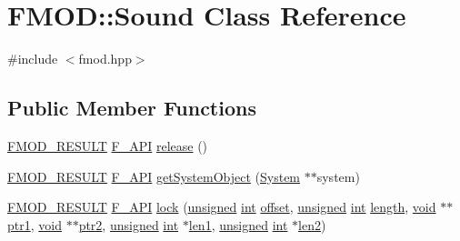 \hypertarget{class_f_m_o_d_1_1_sound}{\section{F\-M\-O\-D\-:\-:Sound Class Reference}
\label{class_f_m_o_d_1_1_sound}
}


{\ttfamily \#include $<$fmod.\-hpp$>$}

\subsection*{Public Member Functions}
\begin{DoxyCompactItemize}
\item 
\hyperlink{fmod_8h_ae6ddadf8cb315e93ae7e6456b19db276}{F\-M\-O\-D\-\_\-\-R\-E\-S\-U\-L\-T} \hyperlink{fmod_8h_ace803d13e798b0cdde4384f9f323b901}{F\-\_\-\-A\-P\-I} \hyperlink{class_f_m_o_d_1_1_sound_ab0d8425b6f8ad26b4011dc36fee9948c}{release} ()
\item 
\hyperlink{fmod_8h_ae6ddadf8cb315e93ae7e6456b19db276}{F\-M\-O\-D\-\_\-\-R\-E\-S\-U\-L\-T} \hyperlink{fmod_8h_ace803d13e798b0cdde4384f9f323b901}{F\-\_\-\-A\-P\-I} \hyperlink{class_f_m_o_d_1_1_sound_aed24d7342fc12299472454730828987e}{get\-System\-Object} (\hyperlink{class_f_m_o_d_1_1_system}{System} $\ast$$\ast$system)
\item 
\hyperlink{fmod_8h_ae6ddadf8cb315e93ae7e6456b19db276}{F\-M\-O\-D\-\_\-\-R\-E\-S\-U\-L\-T} \hyperlink{fmod_8h_ace803d13e798b0cdde4384f9f323b901}{F\-\_\-\-A\-P\-I} \hyperlink{class_f_m_o_d_1_1_sound_a0f83fccead6df86323a21a0ae0207c61}{lock} (\hyperlink{_free_image_8h_a425076c7067a1b5166e2cc530e914814}{unsigned} \hyperlink{wglew_8h_a500a82aecba06f4550f6849b8099ca21}{int} \hyperlink{fmod__output_8h_ac915cd848f42b26af51745f204a3b9af}{offset}, \hyperlink{_free_image_8h_a425076c7067a1b5166e2cc530e914814}{unsigned} \hyperlink{wglew_8h_a500a82aecba06f4550f6849b8099ca21}{int} \hyperlink{fmod__codec_8h_a921fa83f7755f0139c84ba1831417a2e}{length}, \hyperlink{wglew_8h_aeea6e3dfae3acf232096f57d2d57f084}{void} $\ast$$\ast$\hyperlink{fmod__output_8h_a040a88c9095b1eeecd8c5bfdd7355dd4}{ptr1}, \hyperlink{wglew_8h_aeea6e3dfae3acf232096f57d2d57f084}{void} $\ast$$\ast$\hyperlink{fmod__output_8h_affc39513894007e179b6c9b29a5659bf}{ptr2}, \hyperlink{_free_image_8h_a425076c7067a1b5166e2cc530e914814}{unsigned} \hyperlink{wglew_8h_a500a82aecba06f4550f6849b8099ca21}{int} $\ast$\hyperlink{fmod__output_8h_a4b582fef474cc60a5f180dd8c89c150a}{len1}, \hyperlink{_free_image_8h_a425076c7067a1b5166e2cc530e914814}{unsigned} \hyperlink{wglew_8h_a500a82aecba06f4550f6849b8099ca21}{int} $\ast$\hyperlink{fmod__output_8h_a589959d1f80ee502e6fdde57b5a9a48f}{len2})
$$
\end{DoxyCompactItemize}
